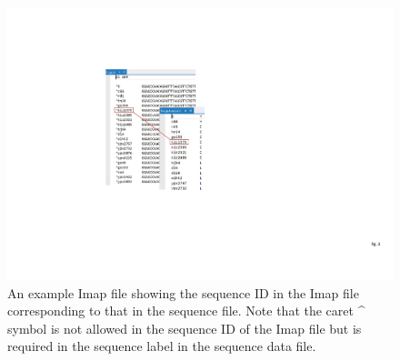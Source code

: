\documentclass[a4paper]{book}
\numberwithin{equation}{section} \renewcommand{\baselinestretch}{0.55}
\begin{document}
\begin{figure}[ht]
  \centering \includegraphics[scale=0.567890]{figures/fig-imap}
  \caption{An example Imap file showing the sequence ID in the Imap
    file corresponding to that in the sequence file. Note that the
    caret \^{} symbol is not allowed in the sequence ID of the Imap
    file but is required in the sequence label in the sequence data
    file.}
  \label{fig-imap}
\end{figure}
\end{document}
